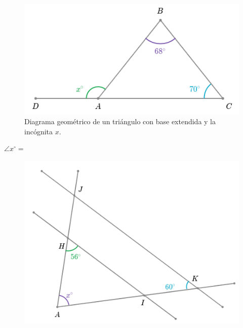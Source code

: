 \documentclass[11pt,addpoints]{exam}
\begin{document}
\begin{questions}
    \begin{minipage}[b]{0.42\textwidth}
        \begin{figure}[H]
            \includegraphics[width=\linewidth]{Images/triangle_angle_07}
            \caption{Diagrama geométrico de un tri\'angulo con base extendida y la inc\'ognita $x$.}
            \label{fig:triangle_angle_01}
        \end{figure}
        \begin{center}
            {\color{cielo}\textbf{$\angle x^\circ =$}} \fbox{
                \begin{minipage}{2cm}
                    \hfill\vspace{0.5cm}
                \end{minipage}
            }
        \end{center}
    \end{minipage}
    \hspace{1cm}
    \begin{minipage}[b]{0.42\textwidth}
        \begin{figure}[H]
            \includegraphics[width=\linewidth]{Images/triangle_angle_04}

\end{figure}
\end{minipage}
\end{questions}
\end{document}
